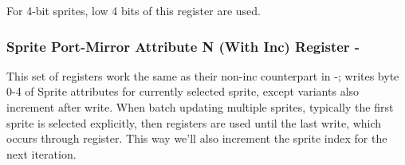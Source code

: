 \begin{NextPort}
\end{NextPort}

For 4-bit sprites, low 4 bits of this register are used.


\subsubsection{Sprite Port-Mirror Attribute N (With Inc) Register -}

This set of registers work the same as their non-inc counterpart in -; writes byte 0-4 of Sprite attributes for currently selected sprite, except  variants also increment  after write. When batch updating multiple sprites, typically the first sprite is selected explicitly, then  registers are used until the last write, which occurs through  register. This way we'll also increment the sprite index for the next iteration.


\pagebreak